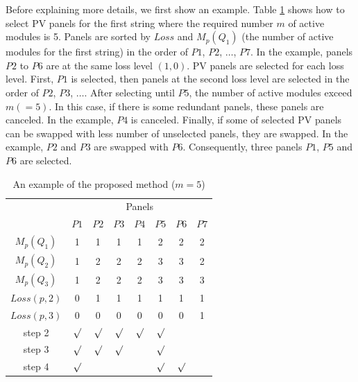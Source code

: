 \documentclass[conference]{pvsctran}
\begin{document}
Before explaining more details, we first show an example.
Table \ref{tab:proposed-example} shows how to select PV panels for the first string where the required number $m$ of active modules is 5. 
Panels are sorted by $Loss$ and $M_{p}(Q_{1})$ (the number of active modules for the first string) in the order of $P1$, $P2$, $\ldots$, $P7$. 
In the example, panels $P2$ to $P6$ are at the same loss level $(1,0)$. 
PV panels are selected for each loss level. First, $P1$ is selected, then panels at the second loss level are selected in the order of $P2$, $P3$, $\ldots$. After selecting until $P5$, the number of active modules exceed $m (=5)$. In this case, if there is some redundant panels, these panels are canceled. In the example, $P4$ is canceled. Finally, if some of selected PV panels can be swapped with less number of unselected panels, they are swapped. In the example, $P2$ and $P3$ are swapped with $P6$. Consequently, three panels $P1$, $P5$ and $P6$ are selected. 

\begin{table}[t]
\caption{An example of the proposed method ($m = 5$)}
\begin{center}
\begin{tabular}{c|c|ccccc|c}\hline \hline
                               & \multicolumn{7}{c}{Panels}  \\
                               &  \multicolumn{1}{c}{$P1$}    & $P2$   & $P3$    & $P4$    & $P5$   & \multicolumn{1}{c}{$P6$}            & $P7$             \\ \hline
$M_{p}(Q_1)$        & 1     & 1     & 1     & 1     & 2    & 2    & 2              \\ \hline
$M_{p}(Q_2)$        & 1     & 2     & 2     & 2     & 3    & 3    & 2              \\ \hline
$M_{p}(Q_3)$        & 1     & 2     & 2     & 2     & 3    & 3    & 3              \\ \hline
$Loss(p,2)$           & 0     & 1     & 1     & 1     & 1    & 1    & 1    \\ \hline
$Loss(p,3)$           & 0     & 0     & 0     & 0     & 0    & 0    & 1    \\ \hline\hline
step 2        & $\surd$ & $\surd$ &$\surd$ &$\surd$ &$\surd$ & & \\ \hline
step 3      & $\surd$ & $\surd$ &$\surd$ & &$\surd$ & & \\ \hline
step 4       & $\surd$ &  & & &$\surd$ & $\surd$ & \\ \hline         
\end{tabular}
\end{center}
\label{tab:proposed-example}
\end{table}
\end{document}
